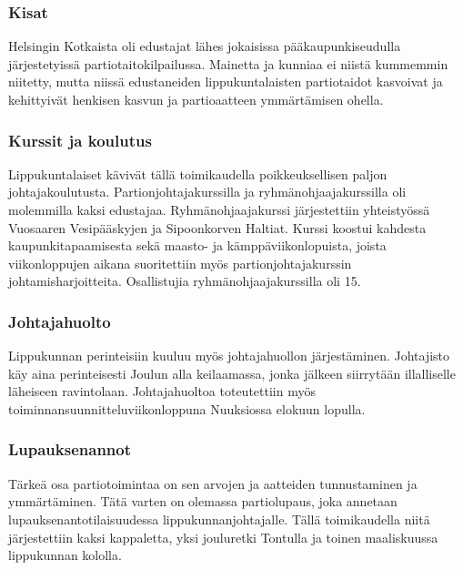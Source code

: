 \subsubsection{Kisat}
Helsingin Kotkaista oli edustajat lähes jokaisissa pääkaupunkiseudulla järjestetyissä partiotaitokilpailussa. Mainetta ja kunniaa ei niistä kummemmin niitetty, mutta niissä edustaneiden lippukuntalaisten partiotaidot kasvoivat ja kehittyivät henkisen kasvun ja partioaatteen ymmärtämisen ohella.
\subsubsection{Kurssit ja koulutus}
Lippukuntalaiset kävivät tällä toimikaudella poikkeuksellisen paljon johtajakoulutusta. Partionjohtajakurssilla ja ryhmänohjaajakurssilla oli molemmilla kaksi edustajaa. Ryhmänohjaajakurssi järjestettiin yhteistyössä Vuosaaren Vesipääskyjen ja Sipoonkorven Haltiat. Kurssi koostui kahdesta kaupunkitapaamisesta sekä maasto- ja kämppäviikonlopuista, joista viikonloppujen aikana suoritettiin myös partionjohtajakurssin johtamisharjoitteita. Osallistujia ryhmänohjaajakurssilla oli 15.
\subsubsection{Johtajahuolto}
Lippukunnan perinteisiin kuuluu myös johtajahuollon järjestäminen. Johtajisto käy aina perinteisesti Joulun alla keilaamassa, jonka jälkeen siirrytään illalliselle läheiseen ravintolaan. Johtajahuoltoa toteutettiin myös toiminnansuunnitteluviikonloppuna Nuuksiossa elokuun lopulla.
\subsubsection{Lupauksenannot}
Tärkeä osa partiotoimintaa on sen arvojen ja aatteiden tunnustaminen ja ymmärtäminen. Tätä varten on olemassa partiolupaus, joka annetaan lupauksenantotilaisuudessa lippukunnanjohtajalle. Tällä toimikaudella niitä järjestettiin kaksi kappaletta, yksi jouluretki Tontulla ja toinen maaliskuussa lippukunnan kololla.
\newpage

